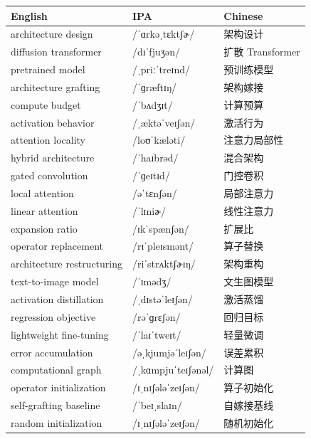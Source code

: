 \documentclass[UTF8,12pt,a4paper]{ctexart}
\providecommand{\zh}[1]{#1}
\begin{document}
\begin{tabular*}{\textwidth}{@{\extracolsep{\fill}}lll@{}}
\toprule
\textbf{English} & \textbf{IPA} & \textbf{Chinese} \\
\midrule
architecture design & {\ipafont /ˈɑrkəˌtɛktʃɚ/} & \zh{架构设计} \\
diffusion transformer & {\ipafont /dɪˈfjuʒən/} & \zh{扩散 Transformer} \\
pretrained model & {\ipafont /ˌpriːˈtreɪnd/} & \zh{预训练模型} \\
architecture grafting & {\ipafont /ˈɡræftɪŋ/} & \zh{架构嫁接} \\
compute budget & {\ipafont /ˈbʌdʒɪt/} & \zh{计算预算} \\
activation behavior & {\ipafont /ˌæktəˈveɪʃən/} & \zh{激活行为} \\
attention locality & {\ipafont /loʊˈkæləti/} & \zh{注意力局部性} \\
hybrid architecture & {\ipafont /ˈhaɪbrəd/} & \zh{混合架构} \\
gated convolution & {\ipafont /ˈɡeɪtɪd/} & \zh{门控卷积} \\
local attention & {\ipafont /əˈtɛnʃən/} & \zh{局部注意力} \\
linear attention & {\ipafont /ˈlɪniɚ/} & \zh{线性注意力} \\
expansion ratio & {\ipafont /ɪkˈspænʃən/} & \zh{扩展比} \\
operator replacement & {\ipafont /rɪˈpleɪsmənt/} & \zh{算子替换} \\
architecture restructuring & {\ipafont /riˈstrʌktʃɚɪŋ/} & \zh{架构重构} \\
text-to-image model & {\ipafont /ˈɪmədʒ/} & \zh{文生图模型} \\
activation distillation & {\ipafont /ˌdɪstəˈleɪʃən/} & \zh{激活蒸馏} \\
regression objective & {\ipafont /rəˈɡrɛʃən/} & \zh{回归目标} \\
lightweight fine-tuning & {\ipafont /ˈlaɪˈtweɪt/} & \zh{轻量微调} \\
error accumulation & {\ipafont /əˌkjumjəˈleɪʃən/} & \zh{误差累积} \\
computational graph & {\ipafont /ˌkɑmpjuˈteɪʃənəl/} & \zh{计算图} \\
operator initialization & {\ipafont /ɪˌnɪʃələˈzeɪʃən/} & \zh{算子初始化} \\
self-grafting baseline & {\ipafont /ˈbeɪˌslaɪn/} & \zh{自嫁接基线} \\
random initialization & {\ipafont /ɪˌnɪʃələˈzeɪʃən/} & \zh{随机初始化} \\

\end{tabular*}
\end{document}
